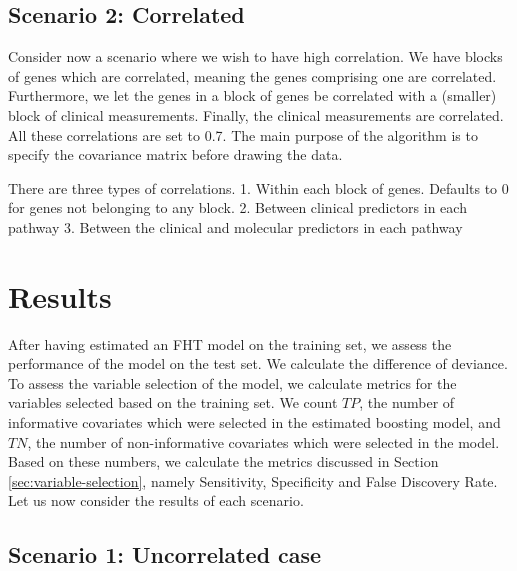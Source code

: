 \subsection{Scenario 2: Correlated}
Consider now a scenario where we wish to have high correlation.
We have blocks of genes which are correlated, meaning the genes comprising one are correlated.
Furthermore, we let the genes in a block of genes be correlated with a (smaller) block of clinical measurements.
Finally, the clinical measurements are correlated.
All these correlations are set to 0.7.
The main purpose of the algorithm is to specify the covariance matrix before drawing the data.

There are three types of correlations.
1. Within each block of genes. Defaults to 0 for genes not belonging to any block.
2. Between clinical predictors in each pathway
3. Between the clinical and molecular predictors in each pathway

\section{Results}
After having estimated an FHT model on the training set, we assess the performance of the model on the test set.
We calculate the difference of deviance.
To assess the variable selection of the model, we calculate metrics for the variables selected based on the training set.
We count $TP$, the number of informative covariates which were selected in the estimated boosting model, and $TN$, the number of non-informative covariates which were selected in the model.
Based on these numbers, we calculate the metrics discussed in Section \ref{sec:variable-selection}, namely Sensitivity, Specificity and False Discovery Rate.
Let us now consider the results of each scenario.

\subsection{Scenario 1: Uncorrelated case}
